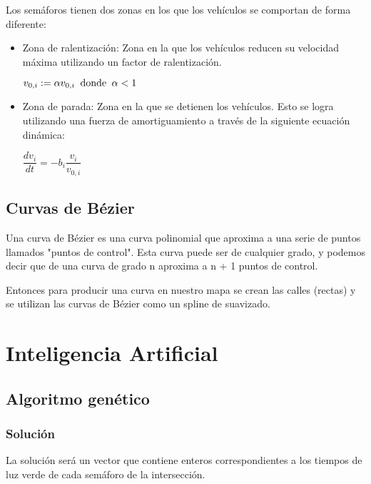 \documentclass[twoside,twocolumn]{article} %
\begin{document}
	Los sem\'aforos tienen dos zonas en los que los veh\'iculos se comportan de forma diferente:
	\begin{itemize}
		\item Zona de ralentización: Zona en la que los vehículos reducen su velocidad máxima utilizando un factor de ralentización.
		\begin{center}
			$ v_{0,i} := \alpha v_{0,i} \text{\hspace{0.2em} donde \hspace{0.2em}} \alpha < 1$
		\end{center}
		\item Zona de parada: Zona en la que se detienen los vehículos. Esto se logra utilizando una fuerza de amortiguamiento a través de la siguiente ecuación dinámica:
		\begin{center}
			$ \dfrac{dv_{i}}{dt} = -b_{i} \dfrac{v_{i}}{v_{0,i}} $
		\end{center}
	\end{itemize}
	
	\subsection{Curvas de Bézier}
	
	Una curva de Bézier es una curva polinomial que aproxima a una serie de puntos llamados "puntos de control". Esta curva puede ser de cualquier grado, y podemos decir que de una curva de grado n aproxima a  n + 1 puntos de control. 
	
	Entonces para producir una curva en nuestro mapa se crean las calles (rectas) y se utilizan las curvas de B\'ezier como un spline de suavizado.
	 
	\section{Inteligencia Artificial}
	
	\subsection{Algoritmo genético}
	
	\subsubsection{Solución}
	
	La solución será un vector que contiene enteros correspondientes a los tiempos de luz verde de cada semáforo de la intersección.
	
\end{document}

